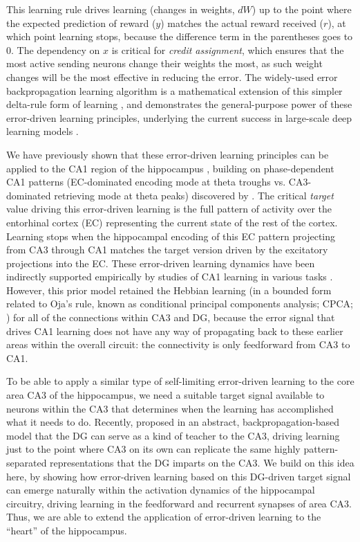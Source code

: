 \documentclass[11pt,twoside]{article}
\newif\myifpdf
\begin{document}
This learning rule drives learning (changes in weights, $dW$) up to the point where the expected prediction of reward ($y$) matches the actual reward received ($r$), at which point learning stops, because the difference term in the parentheses goes to 0. The dependency on $x$ is critical for \emph{credit assignment}, which ensures that the most active sending neurons change their weights the most, as such weight changes will be the most effective in reducing the error.  The widely-used error backpropagation learning algorithm is a mathematical extension of this simpler delta-rule form of learning \citep{RumelhartHintonWilliams86}, and demonstrates the general-purpose power of these error-driven learning principles, underlying the current success in large-scale deep learning models \citep{LeCunBengioHinton15}.

We have previously shown that these error-driven learning principles can be applied to the CA1 region of the hippocampus \citep{KetzMorkondaOReilly13}, building on phase-dependent CA1 patterns (EC-dominated encoding mode at theta troughs vs. CA3-dominated retrieving mode at theta peaks) discovered by \citet{HasselmoBodelonWyble02}.  The critical \emph{target} value driving this error-driven learning is the full pattern of activity over the entorhinal cortex (EC) representing the current state of the rest of the cortex.  Learning stops when the hippocampal encoding of this EC pattern projecting from CA3 through CA1 matches the target version driven by the excitatory projections into the EC.  These error-driven learning dynamics have been indirectly supported empirically by studies of CA1 learning in various tasks \citep{SchapiroTurk-BrowneNormanEtAl16,SchapiroTurk-BrowneBotvinickEtAl17}.  However, this prior model retained the Hebbian learning (in a bounded form related to Oja's rule, known as conditional principal components analysis; CPCA; \citealp{OReillyMunakata00}) for all of the connections within CA3 and DG, because the error signal that drives CA1 learning does not have any way of propagating back to these earlier areas within the overall circuit: the connectivity is only feedforward from CA3 to CA1.

To be able to apply a similar type of self-limiting error-driven learning to the core area CA3 of the hippocampus, we need a suitable target signal available to neurons within the CA3 that determines when the learning has accomplished what it needs to do.  Recently, \citet{KowadloAhmedRawlinson20} proposed in an abstract, backpropagation-based model that the DG can serve as a kind of teacher to the CA3, driving learning just to the point where CA3 on its own can replicate the same highly pattern-separated representations that the DG imparts on the CA3.  We build on this idea here, by showing how error-driven learning based on this DG-driven target signal can emerge naturally within the activation dynamics of the hippocampal circuitry, driving learning in the feedforward and recurrent synapses of area CA3.  Thus, we are able to extend the application of error-driven learning to the ``heart'' of the hippocampus.
\end{document}
